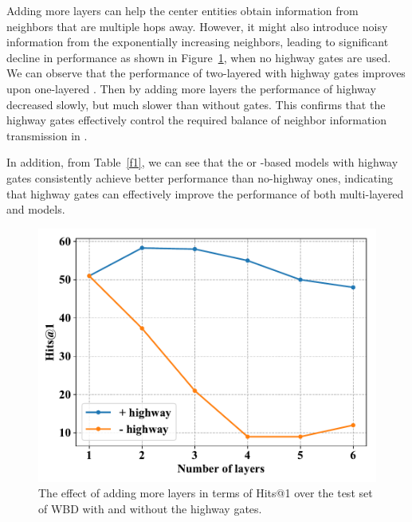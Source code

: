 Adding more \HRGCN layers can help the center entities obtain information from neighbors that are multiple hops away. However, it might also introduce noisy information from the exponentially increasing neighbors, leading to significant decline in performance as shown in Figure~\ref{highway}, when no highway gates are used. We can observe that the performance of two-layered \RGCNs with highway gates improves upon one-layered \RGCN. Then by adding more layers the performance of highway \RGCNs decreased slowly, but much slower than \RGCNs without gates. This confirms that the highway gates effectively control the required balance of neighbor information transmission in \RGCNs.

In addition, from Table~\ref{f1}, we can see that the \GCN or \RGCN-based models with highway gates consistently achieve better performance than no-highway ones, indicating that highway gates can effectively improve the performance of both multi-layered \GCN and \RGCN models.
\begin{figure}
	\centering
	\includegraphics[width=0.8\linewidth]{figures/graph3.pdf}
	\caption{The effect of adding more \RGCN layers in terms of Hits@1 over the test set of WBD with and without the highway gates.}
	\label{highway}
\end{figure}
